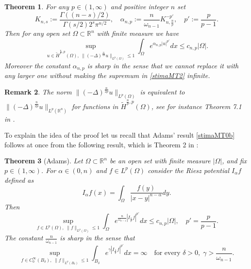 \documentclass[11pt, a4paper]{article}
\newtheorem{trm}{Theorem}
\newtheorem{rmk}[trm]{Remark}
\newcommand{\R}{\mathbb{R}}
\begin{document}
\begin{trm}\label{MT2} For any $p\in (1,\infty)$ and positive integer $n$ set
\begin{equation}\label{defalpha}
K_{n,s}:=\frac{\Gamma((n-s)/2)}{\Gamma(s/2) 2^{s}\pi^{n/2}},\quad \alpha_{n,p}:=\frac{n}{\omega_{n-1}} K_{n,\frac{n}{p}}^{-p'},\quad p':=\frac{p}{p-1}.
\end{equation}
Then for any open set $\Omega\subset \R^{n}$ with finite measure we have
\begin{equation}\label{stimaMT2}
\sup_{u\in \tilde H^{\frac{n}{p},p}(\Omega), \;\|(-\Delta)^{\frac{n}{2p}}u\|_{L^{p}(\Omega)}\leq 1}\int_{\Omega} e^{\alpha_{n,p} |u|^{p'}}dx \leq c_{n,p}|\Omega|.
\end{equation}
Moreover the constant $\alpha_{n,p}$ is sharp in the sense that
we cannot replace it with any larger one without making the supremum in \eqref{stimaMT2} infinite.
\end{trm}

\begin{rmk} The norm $\|(-\Delta)^{\frac{n}{2p}}u\|_{L^{p}(\Omega)}$ is equivalent to $\|(-\Delta)^{\frac{n}{2p}}u\|_{L^{p}(\R^{n})}$ for functions in $\tilde H^{\frac{n}{p},p}(\Omega)$,
see for instance Theorem 7.1 in \cite{Gr0}.
\end{rmk}

To explain the idea of the proof let us recall that Adams' result \eqref{stimaMT0b} follows at once from the following result, which is Theorem 2 in \cite{ada}:

\begin{trm}[Adams]\label{trmadams}
Let $\Omega \subset\R^{n}$ be an open set with finite measure $|\Omega|$, and fix $p\in (1,\infty)$. For $\alpha\in (0,n)$ and $f\in L^p(\Omega)$ consider the Riesz potential $I_{\alpha}f$ defined as
$$I_\alpha f(x)=\int_\Omega \frac{f(y)}{|x-y|^{n-\alpha}}dy.$$
Then
$$\sup_{f\in L^p(\Omega),\;\|f\|_{L^p(\Omega)}\le 1} \int_{\Omega}e^{\frac n{\omega_{n-1}} |I_{\frac np}f|^{p'}}dx\le c_{n,p}|\Omega|,\quad p'=\frac{p}{p-1}.$$
The constant $\frac{n}{\omega_{n-1}}$ is sharp in the sense that
$$\sup_{f\in C^\infty_0(B_\delta),\;\|f\|_{L^p(B_\delta)}\le 1} \int_{B_\delta}e^{\gamma |I_{\frac np}f|^{p'}}dx=\infty \quad \text{for every }\delta>0,\;\gamma>\frac{n}{\omega_{n-1}}. $$
\end{trm}
\end{document}
